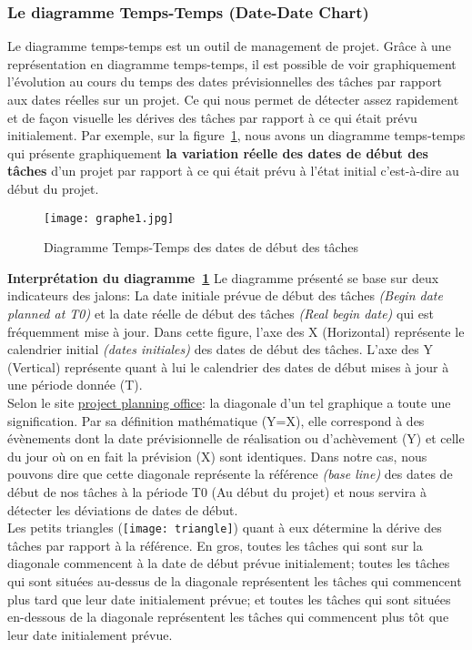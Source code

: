 \subsubsection*{Le diagramme Temps-Temps (Date-Date Chart)}
Le diagramme temps-temps est un outil de management de projet. Grâce à une représentation en diagramme temps-temps, il est possible de voir graphiquement l'évolution  au cours du temps des dates prévisionnelles des tâches par rapport aux dates réelles sur un projet. Ce qui nous permet de détecter assez rapidement et de façon visuelle les dérives des tâches par rapport à ce qui était prévu initialement. Par exemple, sur la figure~\ref{graphe1}, nous avons un diagramme temps-temps qui présente graphiquement \textbf{la variation réelle des dates de début des tâches} d'un projet par rapport à ce qui était prévu à l'état initial c'est-à-dire au début du projet.
\begin{figure}[h]
\centering
\texttt{[image: graphe1.jpg]}
\caption{\label{graphe1}Diagramme Temps-Temps des dates de début des tâches}
\end{figure}
\textbf{Interprétation du diagramme~\ref{graphe1}}
Le diagramme présenté se base sur deux indicateurs des jalons: La date initiale prévue de début des tâches \textit{(Begin date planned at T0)} et la date réelle de début des tâches \textit{(Real begin date)} qui est fréquemment mise à jour. Dans cette figure, l'axe des X (Horizontal) représente le calendrier initial \textit{(dates initiales)} des dates de début des tâches. L'axe des Y (Vertical) représente quant à lui le calendrier des dates de début mises à jour à une période donnée (T).\\
Selon le site \href{http://www.projectplanningoffice.com/}{project planning office}: \og la diagonale d'un tel graphique a toute une signification. Par sa définition mathématique (Y=X), elle correspond à des évènements dont la date prévisionnelle de réalisation ou d'achèvement (Y) et celle du jour où on en fait la prévision (X) sont identiques\fg{}. Dans notre cas, nous pouvons dire que cette diagonale représente la référence \textit{(base line)} des dates de début de nos tâches à la période T0 (Au début du projet) et nous servira à détecter les déviations de dates de début. \\
Les petits triangles (\texttt{[image: triangle]}) quant à eux  détermine la dérive des tâches par rapport à la référence. En gros, toutes les tâches qui sont sur la diagonale commencent à la date de début prévue initialement; toutes les tâches qui sont situées au-dessus de la diagonale représentent les tâches qui commencent plus tard que leur date initialement prévue; et toutes les tâches qui sont situées en-dessous de la diagonale représentent les tâches qui commencent plus tôt que leur date initialement prévue.
